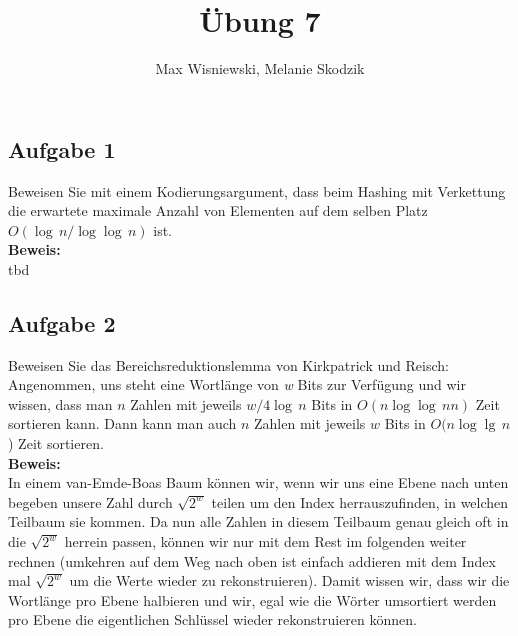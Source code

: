 \documentclass[11pt,a4paper,ngerman]{article}
\date{}
\title{Übung 7}
\author{Max Wisniewski, Melanie Skodzik}
\begin{document}

\renewcommand{\figurename}{Grafik}

\maketitle
\thispagestyle{fancy}


\subsection*{Aufgabe 1}

Beweisen Sie mit einem Kodierungsargument, dass beim Hashing mit Verkettung die erwartete maximale Anzahl von Elementen auf dem selben Platz $O(\log \,n / \log \log \, n)$ ist.\\

\noindent\textbf{Beweis:}\\
tbd


\subsection*{Aufgabe 2}

Beweisen Sie das Bereichsreduktionslemma von Kirkpatrick und Reisch: Angenommen, uns steht eine Wortlänge von \emph{w} Bits zur Verfügung und wir wissen, dass man $n$ Zahlen mit jeweils $w/4\log \, n$ Bits in $O(n \log\log \,n n)$ Zeit sortieren kann. Dann kann man auch $n$ Zahlen mit jeweils $w$ Bits in $O(n \log \lg \, n$) Zeit sortieren.\\

\noindent\textbf{Beweis:}\\

In einem van-Emde-Boas Baum können wir, wenn wir uns eine Ebene nach unten begeben unsere Zahl durch $\sqrt{2^w}$ teilen um den Index
herrauszufinden, in welchen Teilbaum sie kommen. Da nun alle Zahlen in diesem Teilbaum genau gleich oft in die $\sqrt{2^w}$ herrein passen, können wir nur mit dem Rest im folgenden weiter rechnen (umkehren auf dem Weg nach oben ist einfach addieren mit dem Index mal $\sqrt{2^w}$ um
die Werte wieder zu rekonstruieren). Damit wissen wir, dass wir die Wortlänge pro Ebene halbieren und wir, egal wie die Wörter umsortiert werden
pro Ebene die eigentlichen Schlüssel wieder rekonstruieren können.\\
\end{document}
